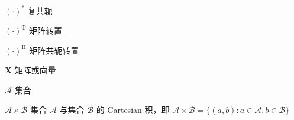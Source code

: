 
\begin{listofnotations}
\item [$(\cdot)^*$] 复共轭
\item [$(\cdot)^{\mathrm T}$] 矩阵转置
\item [$(\cdot)^{\mathrm H}$] 矩阵共轭转置
\item [$\mathbf{X}$] 矩阵或向量
\item [$\mathcal{A}$] 集合
\item [$\mathcal{A}\times\mathcal{B}$]
  集合 $\mathcal{A}$ 与集合 $\mathcal{B}$ 的 Cartesian 积，即 $\mathcal{A}\times\mathcal{B}=\{(a,b):a\in\mathcal{A},b\in\mathcal{B}\}$
\end{listofnotations}
